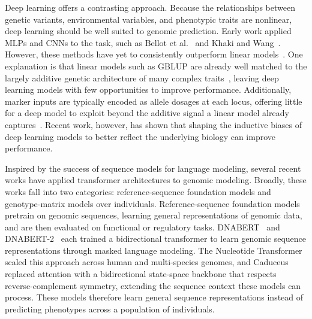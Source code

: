 Deep learning offers a contrasting approach. Because the relationships between genetic variants, environmental variables, and phenotypic traits are nonlinear, deep learning should be well suited to genomic prediction. Early work applied MLPs and CNNs to the task, such as Bellot et al.~\cite{bellot2018can} and Khaki and Wang~\cite{khaki2019crop}. However, these methods have yet to consistently outperform linear models~\cite{montesinos2021review, azodi2019benchmarking}. One explanation is that linear models such as GBLUP are already well matched to the largely additive genetic architecture of many complex traits~\cite{hill2008data}, leaving deep learning models with few opportunities to improve performance. Additionally, marker inputs are typically encoded as allele dosages at each locus, offering little for a deep model to exploit beyond the additive signal a linear model already captures~\cite{bellot2018can}. Recent work, however, has shown that shaping the inductive biases of deep learning models to better reflect the underlying biology can improve performance.

Inspired by the success of sequence models for language modeling, several recent works have applied transformer architectures to genomic modeling. Broadly, these works fall into two categories: reference-sequence foundation models and genotype-matrix models over individuals. Reference-sequence foundation models pretrain on genomic sequences, learning general representations of genomic data, and are then evaluated on functional or regulatory tasks. DNABERT~\cite{dnabert} and DNABERT-2~\cite{dnabert2} each trained a bidirectional transformer to learn genomic sequence representations through masked language modeling. The Nucleotide Transformer~\cite{nucleotide-transformer} scaled this approach across human and multi-species genomes, and Caduceus~\cite{caduceus} replaced attention with a bidirectional state-space backbone that respects reverse-complement symmetry, extending the sequence context these models can process. These models therefore learn general sequence representations instead of predicting phenotypes across a population of individuals.

